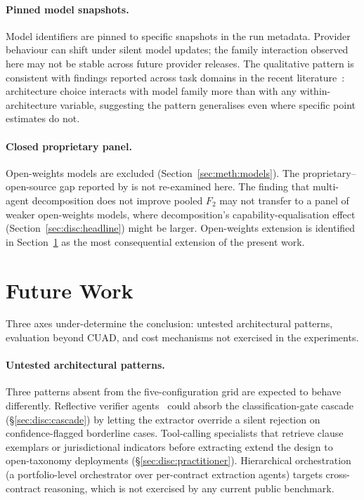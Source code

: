 \paragraph{Pinned model snapshots.}
Model identifiers are pinned to specific snapshots in the run metadata.
Provider behaviour can shift under silent model updates; the family
interaction observed here may not be stable across future provider releases.
The qualitative pattern is consistent with findings reported across task
domains in the recent literature~\cite{gao2025single,cemri2025why}:
architecture choice interacts with model family more than with any
within-architecture variable, suggesting the pattern generalises even where
specific point estimates do not.

\paragraph{Closed proprietary panel.}
Open-weights models are excluded (Section~\ref{sec:meth:models}).
The proprietary--open-source gap reported by \textcite{liu2025contracteval} is
not re-examined here. The finding that multi-agent decomposition does not
improve pooled $F_2$ may not transfer to a panel of weaker open-weights
models, where decomposition's capability-equalisation effect
(Section~\ref{sec:disc:headline}) might be larger. Open-weights extension
is identified in Section~\ref{sec:concl:outlook} as the most consequential
extension of the present work.

\section{Future Work}\label{sec:concl:outlook}

Three axes under-determine the conclusion: untested architectural patterns,
evaluation beyond CUAD, and cost mechanisms not exercised in the experiments.

\paragraph{Untested architectural patterns.}
Three patterns absent from the five-configuration grid are expected to
behave differently. Reflective verifier agents~\cite{shinn2023reflexion}
could absorb the classification-gate cascade (\S\ref{sec:disc:cascade}) by
letting the extractor override a silent rejection on confidence-flagged
borderline cases. Tool-calling specialists that retrieve clause exemplars
or jurisdictional indicators before extracting extend the design to
open-taxonomy deployments (\S\ref{sec:disc:practitioner}). Hierarchical
orchestration (a portfolio-level orchestrator over per-contract
extraction agents) targets cross-contract reasoning, which is not exercised
by any current public benchmark.

